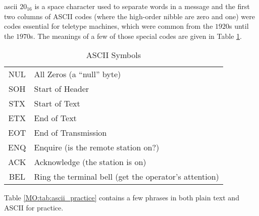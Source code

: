 \gls{ascii} $ 20_{16} $ is a space character used to separate words in a message and the first two columns of ASCII codes (where the high-order nibble are zero and one) were codes essential for teletype machines, which were common from the $ 1920 $s until the $ 1970 $s. The meanings of a few of those special codes are given in Table \ref{MO:tab:ascii_symbols}.

\begin{table}[H]
  \sffamily
  \newcommand{\head}[1]{\textcolor{white}{\textbf{#1}}}    
  \begin{center}
    \begin{tabular}{ c l } 
      \hline \hline %
      {NUL} & {All Zeros (a ``null'' byte)} \\
      {SOH} & {Start of Header} \\
      {STX} & {Start of Text} \\
      {ETX} & {End of Text} \\
      {EOT} & {End of Transmission} \\
      {ENQ} & {Enquire (is the remote station on?)} \\
      {ACK} & {Acknowledge (the station is on)} \\
      {BEL} & {Ring the terminal bell (get the operator's attention)} \\
      \hline  
    \end{tabular}
  \end{center}
  \caption{ASCII Symbols}
  \label{MO:tab:ascii_symbols}
\end{table}

Table \ref{MO:tab:ascii_practice} contains a few phrases in both plain text and ASCII for practice.

